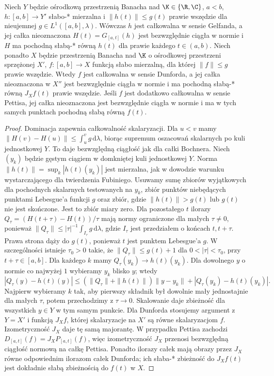\begin{stwierdzenie}
\label{prop:weakstar-primitive-derivative15b}
Niech $Y$ będzie ośrodkową przestrzenią Banacha nad
$\K\in\{\R,\C\}$, $a<b$, $h:[a,b]\to Y'$ słabo-*
mierzalna i $\|h(t)\|\le g(t)$ prawie wszędzie dla
nieujemnej $g\in L^1([a,b],\lambda)$.
Wówczas $h$ jest całkowalna w sensie Gelfanda, a jej
całka nieoznaczona $H(t)=G_{[a,t]}(h)$ jest bezwzględnie
ciągła w normie i $H$ ma pochodną słabą-* równą $h(t)$
dla prawie każdego $t\in(a,b)$.
Niech ponadto $X$ będzie przestrzenią Banacha nad $\K$
o ośrodkowej przestrzeni sprzężonej $X'$,
$f:[a,b]\to X$ funkcją słabo mierzalną, dla której
$\|f\|\le g$ prawie wszędzie. Wtedy $f$ jest całkowalna
w sensie Dunforda, a jej całka nieoznaczona w $X''$
jest bezwzględnie ciągła w normie i ma pochodną słabą-*
równą $J_X f(t)$ prawie wszędzie. Jeśli $f$ jest dodatkowo
całkowalna w sensie Pettisa, jej całka nieoznaczona
jest bezwzględnie ciągła w normie i ma w tych samych
punktach pochodną słabą równą $f(t)$.
\end{stwierdzenie}
\begin{proof}
Dominacja zapewnia całkowalność skalaryzacji.
Dla $u<v$ mamy $\|H(v)-H(u)\|\le\int_u^v g\,\mathrm d\lambda$,
biorąc supremum oszacowań skalarnych po kuli jednostkowej
$Y$. To daje bezwzględną ciągłość jak dla całki Bochnera.
Niech $(y_k)$ będzie gęstym ciągiem w domkniętej kuli
jednostkowej $Y$. Norma $\|h(t)\|=\sup_k|h(t)(y_k)|$
jest mierzalna, jak w dowodzie warunku wystarczającego
dla twierdzenia Fubiniego. Usuwamy sumę zbiorów wyjątkowych dla
pochodnych skalarnych testowanych na $y_k$, zbiór
punktów niebędących punktami Lebesgue'a funkcji $g$
oraz zbiór, gdzie $\|h(t)\|>g(t)$ lub $g(t)$ nie jest
skończone. Jest to zbiór miary zero.
Dla pozostałego $t$ ilorazy
$Q_\tau=(H(t+\tau)-H(t))/\tau$ mają normy ograniczone
dla małych $\tau\ne0$, ponieważ
$\|Q_\tau\|\le |\tau|^{-1}\int_{I_\tau}g\,\mathrm d\lambda$,
gdzie $I_\tau$ jest przedziałem o końcach $t,t+\tau$.
Prawa strona dąży do $g(t)$, ponieważ $t$ jest
punktem Lebesgue'a $g$. W szczególności istnieje
$\tau_0>0$ takie, że $\|Q_\tau\|\le g(t)+1$
dla $0<|\tau|<\tau_0$, przy $t+\tau\in[a,b]$. Dla każdego $k$ mamy
$Q_\tau(y_k)\to h(t)(y_k)$. Dla dowolnego $y$
o normie co najwyżej $1$ wybieramy $y_k$ blisko $y$;
wtedy
\[
 |Q_\tau(y)-h(t)(y)|
 \le (\|Q_\tau\|+\|h(t)\|)\|y-y_k\|
       +|Q_\tau(y_k)-h(t)(y_k)|.
\]
Najpierw wybieramy $k$ tak, aby pierwszy składnik
był dowolnie mały jednostajnie dla małych $\tau$,
potem przechodzimy z $\tau\to0$. Skalowanie daje
zbieżność dla wszystkich $y\in Y$ w tym samym punkcie.
Dla Dunforda stosujemy argument z $Y=X'$ i funkcją
$J_X f$, której skalaryzacje na $X'$ są równe
skalaryzacjom $f$. Izometryczność $J_X$ daje tę samą
majorantę. W przypadku Pettisa zachodzi
$D_{[a,t]}(f)=J_X P_{[a,t]}(f)$, więc izometryczność
$J_X$ przenosi bezwzględną ciągłość normową na całkę
Pettisa. Ponadto ilorazy całek mają
obrazy przez $J_X$ równe odpowiednim ilorazom całek
Dunforda; ich słaba-* zbieżność do $J_X f(t)$ jest
dokładnie słabą zbieżnością do $f(t)$ w $X$.
\end{proof}

